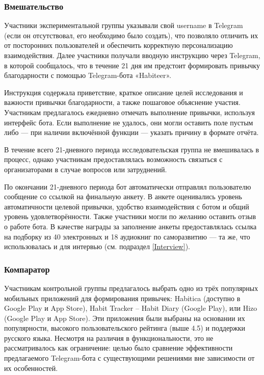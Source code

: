 \documentclass[pdflatex,sn-mathphys-num]{sn-jnl}%
\theoremstyle{thmstyleone}%
\theoremstyle{thmstyletwo}%
\theoremstyle{thmstylethree}%
\begin{document}
\subsubsection{Вмешательство}

Участники экспериментальной группы указывали свой username в Telegram (если он отсутствовал, его необходимо было создать), что позволяло отличить их от посторонних пользователей и обеспечить корректную персонализацию взаимодействия. Далее участники получали вводную инструкцию через Telegram, в которой сообщалось, что в течение 21 дня им предстоит формировать привычку благодарности с помощью Telegram-бота «Habiteer».

Инструкция содержала приветствие, краткое описание целей исследования и важности привычки благодарности, а также пошаговое объяснение участия. Участникам предлагалось ежедневно отмечать выполнение привычки, используя интерфейс бота. Если выполнение не удалось, они могли оставить поле пустым либо — при наличии включённой функции — указать причину в формате отчёта.

В течение всего 21-дневного периода исследовательская группа не вмешивалась в процесс, однако участникам предоставлялась возможность связаться с организаторами в случае вопросов или затруднений.

По окончании 21-дневного периода бот автоматически отправлял пользователю сообщение со ссылкой на финальную анкету. В анкете оценивались уровень автоматичности целевой привычки, удобство взаимодействия с ботом и общий уровень удовлетворённости. Также участники могли по желанию оставить отзыв о работе бота. В качестве награды за заполнение анкеты предоставлялась ссылка на подборку из 40 электронных и 18 аудиокниг по саморазвитию — та же, что использовалась и для интервью (см. подраздел \ref{Interview}).

\subsubsection{Компаратор}

Участникам контрольной группы предлагалось выбрать одно из трёх популярных мобильных приложений для формирования привычек: Habitica (доступно в Google Play и App Store), Habit Tracker – Habit Diary (Google Play), или Hizo (Google Play и App Store). Эти приложения были выбраны на основании их популярности, высокого пользовательского рейтинга (выше 4.5) и поддержки русского языка. Несмотря на различия в функциональности, это не рассматривалось как ограничение: целью было сравнение эффективности предлагаемого Telegram-бота с существующими решениями вне зависимости от их особенностей.
\end{document}
